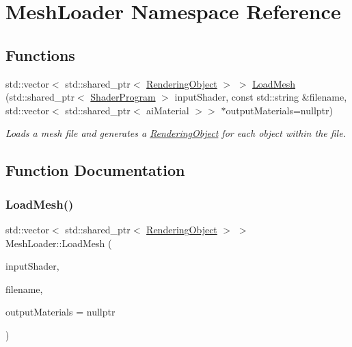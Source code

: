 \hypertarget{namespace_mesh_loader}{}\section{Mesh\+Loader Namespace Reference}
\label{namespace_mesh_loader}
\subsection*{Functions}
\begin{DoxyCompactItemize}
\item 
std\+::vector$<$ std\+::shared\+\_\+ptr$<$ \hyperlink{class_rendering_object}{Rendering\+Object} $>$ $>$ \hyperlink{namespace_mesh_loader_aee3ffe862d7bf408495c62614118fd2a}{Load\+Mesh} (std\+::shared\+\_\+ptr$<$ \hyperlink{class_shader_program}{Shader\+Program} $>$ input\+Shader, const std\+::string \&filename, std\+::vector$<$ std\+::shared\+\_\+ptr$<$ ai\+Material $>$$>$ $\ast$output\+Materials=nullptr)
\begin{DoxyCompactList}\small\item\em Loads a mesh file and generates a \hyperlink{class_rendering_object}{Rendering\+Object} for each object within the file. \end{DoxyCompactList}\end{DoxyCompactItemize}


\subsection{Function Documentation}
\hypertarget{namespace_mesh_loader_aee3ffe862d7bf408495c62614118fd2a}{}\label{namespace_mesh_loader_aee3ffe862d7bf408495c62614118fd2a} 
\subsubsection{\texorpdfstring{Load\+Mesh()}{LoadMesh()}}
{\footnotesize\ttfamily std\+::vector$<$ std\+::shared\+\_\+ptr$<$ \hyperlink{class_rendering_object}{Rendering\+Object} $>$ $>$ Mesh\+Loader\+::\+Load\+Mesh (\begin{DoxyParamCaption}\item[{std\+::shared\+\_\+ptr$<$ \hyperlink{class_shader_program}{Shader\+Program} $>$}]{input\+Shader,  }\item[{const std\+::string \&}]{filename,  }\item[{std\+::vector$<$ std\+::shared\+\_\+ptr$<$ ai\+Material $>$$>$ $\ast$}]{output\+Materials = {\ttfamily nullptr} }\end{DoxyParamCaption})}



